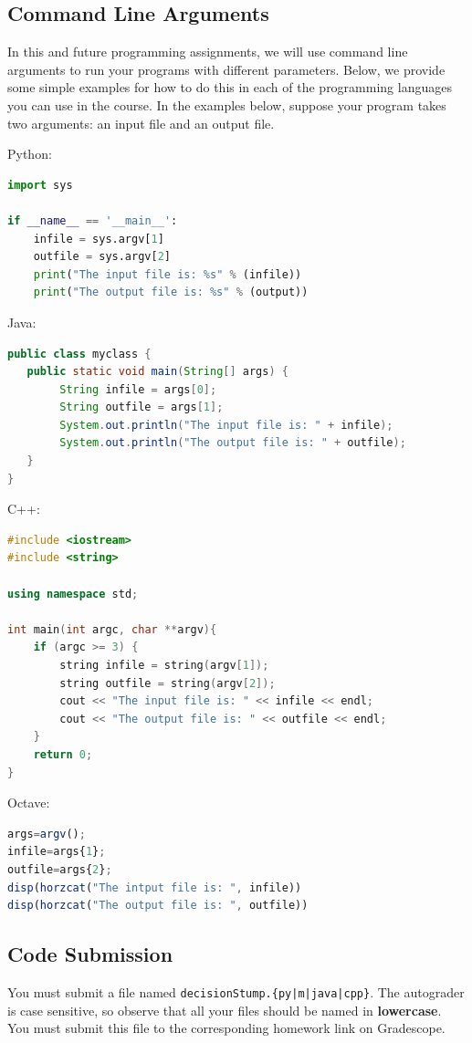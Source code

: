 \documentclass[11pt,addpoints,answers]{exam}
\numberwithin{equation}{section} %
\numberwithin{figure}{section} %
\numberwithin{table}{section} %
\begin{document}
\subsection{Command Line Arguments}

In this and future programming assignments, we will use command line arguments to run your programs with different parameters. Below, we provide some simple examples for how to do this in each of the programming languages you can use in the course. In the examples below, suppose your program takes two arguments: an input file and an output file.

Python:
\begin{lstlisting}[language=Python]
import sys

if __name__ == '__main__':
    infile = sys.argv[1]
    outfile = sys.argv[2]
    print("The input file is: %s" % (infile))
    print("The output file is: %s" % (output))
\end{lstlisting}
\clearpage
Java:
\begin{lstlisting}[language=Java]
public class myclass {
   public static void main(String[] args) {
        String infile = args[0];
        String outfile = args[1];
        System.out.println("The input file is: " + infile);
        System.out.println("The output file is: " + outfile);
   }
}
\end{lstlisting}

C++:
\begin{lstlisting}[language=C++]
#include <iostream>
#include <string>

using namespace std;

int main(int argc, char **argv){
    if (argc >= 3) {
        string infile = string(argv[1]);
        string outfile = string(argv[2]);
        cout << "The input file is: " << infile << endl;
        cout << "The output file is: " << outfile << endl;
    }
    return 0;
}
\end{lstlisting}

Octave:
\begin{lstlisting}[language=Octave]
args=argv();
infile=args{1};
outfile=args{2};
disp(horzcat("The intput file is: ", infile))
disp(horzcat("The output file is: ", outfile))
\end{lstlisting}

\subsection{Code Submission}

You must submit a file named \texttt{decisionStump.\{py|m|java|cpp\}}. The autograder is case sensitive, so observe that all your files should be named in \textbf{lowercase}. You must submit this file to the corresponding homework link on Gradescope.
\end{document}
